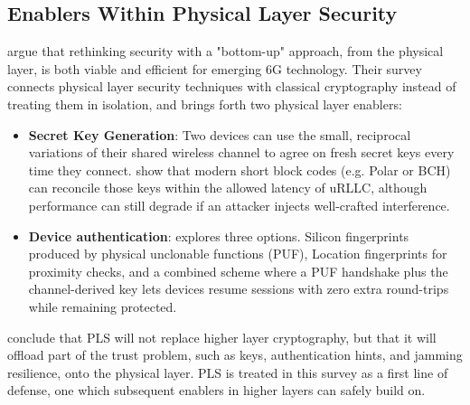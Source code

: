 \documentclass[acmtog]{acmart}
\begin{document}
\subsection{Enablers Within Physical Layer Security}
\cite{ref1} argue that rethinking security with a "bottom-up" approach, from the physical layer, is both viable and efficient for emerging 6G technology. Their survey connects physical layer security techniques with classical cryptography instead of treating them in isolation, and brings forth two physical layer enablers:
\begin{itemize}
  \item \textbf{Secret Key Generation}: Two devices can use the small, reciprocal variations of their shared wireless channel to agree on fresh secret keys every time they connect. \cite{ref1} show that modern short block codes (e.g. Polar or BCH) can reconcile those keys within the allowed latency of uRLLC, although performance can still degrade if an attacker injects well-crafted interference.
  \item \textbf{Device authentication}: \cite{ref1} explores three options. Silicon fingerprints produced by physical unclonable functions (PUF), Location fingerprints for proximity checks, and a combined scheme where a PUF handshake plus the channel-derived key lets devices resume sessions with zero extra round-trips while remaining protected.
\end{itemize}
\cite{ref1} conclude that PLS will not replace higher layer cryptography, but that it will offload part of the trust problem, such as keys, authentication hints, and jamming resilience, onto the physical layer. PLS is treated in this survey as a first line of defense, one which subsequent enablers in higher layers can safely build on.
\end{document}
